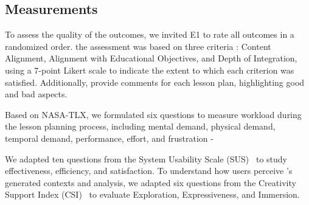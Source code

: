 \subsection{Measurements}

To assess the quality of the outcomes, we invited E1 to rate all outcomes in a randomized order.
the assessment was based on three criteria 
: Content Alignment, Alignment with Educational Objectives, and Depth of Integration, using a 7-point Likert scale  to indicate the extent to which each criterion was satisfied. Additionally,  provide comments for each lesson plan, highlighting good and bad aspects.

 Based on NASA-TLX, we formulated six questions to measure workload during the lesson planning process, including mental demand, physical demand, temporal demand, performance, effort, and frustration - 


 We adapted ten questions from the System Usability Scale (SUS)~\cite{brooke2013sus} to study effectiveness, efficiency, and satisfaction. 
To understand how users perceive \name{}'s generated contexts and analysis, we adapted six questions from the Creativity Support Index (CSI)~\cite{cherry2014quantifying} to evaluate Exploration, Expressiveness, and Immersion. 



